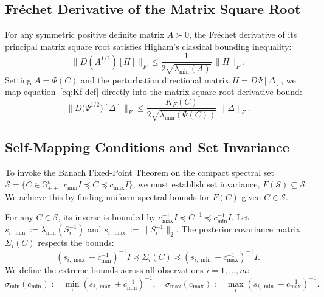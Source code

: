 \documentclass[11pt]{article}
\begin{document}
\subsection{Fr\'echet Derivative of the Matrix Square Root}
For any symmetric positive definite matrix $A \succ 0$, the Fr\'echet derivative of its principal matrix square root satisfies Higham's classical bounding inequality:
\begin{equation}\label{eq:sqrt-bound}
\|D(A^{1/2})[H]\|_F \le \frac{1}{2\sqrt{\lambda_{\min}(A)}}\,\|H\|_F.
\end{equation}
Setting $A = \Psi(C)$ and the perturbation directional matrix $H = D\Psi[\Delta]$, we map equation~\eqref{eq:Kf-def} directly into the matrix square root derivative bound:
\begin{equation}\label{eq:dPsisqrt}
\|D\big(\Psi^{1/2}\big)[\Delta]\|_F \le \frac{K_F(C)}{2\sqrt{\lambda_{\min}(\Psi(C))}}\,\|\Delta\|_F.
\end{equation}

\subsection{Self-Mapping Conditions and Set Invariance}
To invoke the Banach Fixed-Point Theorem on the compact spectral set $\mathcal{S} = \{C \in \mathbb{S}_{++}^n : c_{\min}I \preceq C \preceq c_{\max}I\}$, we must establish set invariance, $F(\mathcal{S}) \subseteq \mathcal{S}$. We achieve this by finding uniform spectral bounds for $F(C)$ given $C \in \mathcal{S}$.

For any $C \in \mathcal{S}$, its inverse is bounded by $c_{\max}^{-1}I \preceq C^{-1} \preceq c_{\min}^{-1}I$. Let $s_{i,\min} := \lambda_{\min}(S_i^{-1})$ and $s_{i,\max} := \|S_i^{-1}\|_2$. The posterior covariance matrix $\Sigma_i(C)$ respects the bounds:
\begin{equation}
(s_{i,\max} + c_{\min}^{-1})^{-1}I \preceq \Sigma_i(C) \preceq (s_{i,\min} + c_{\max}^{-1})^{-1}I.
\end{equation}
We define the extreme bounds across all observations $i=1,\dots,m$:
\begin{equation}
\sigma_{\min}(c_{\min}) := \min_{i} (s_{i,\max} + c_{\min}^{-1})^{-1}, \quad \sigma_{\max}(c_{\max}) := \max_{i} (s_{i,\min} + c_{\max}^{-1})^{-1}.
\end{equation}
\end{document}
